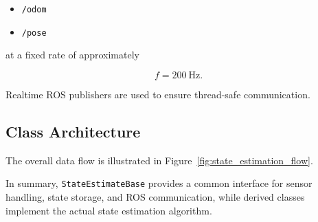 \begin{itemize}
    \item \texttt{/odom}
    \item \texttt{/pose}
\end{itemize}

at a fixed rate of approximately

\begin{equation}
f = 200\ \text{Hz}.
\end{equation}

Realtime ROS publishers are used to ensure thread-safe communication.

\subsection{Class Architecture}

The overall data flow is illustrated in Figure~\ref{fig:state_estimation_flow}.



In summary, \texttt{StateEstimateBase} provides a common interface for sensor handling, state storage, and ROS communication, while derived classes implement the actual state estimation algorithm.